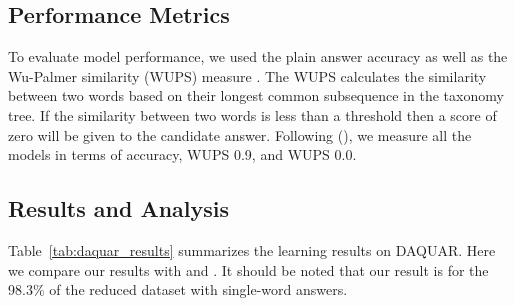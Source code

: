 \documentclass{article}
\renewcommand{\*}[1]{\textbf{#1}}
\newcommand{\shortcite}[1]{\citeauthor{#1} (\citeyear{#1})}
\begin{document}
\subsection{Performance Metrics}
To evaluate model performance, we used the plain answer accuracy as well as 
the Wu-Palmer similarity (WUPS) measure \cite{wu94, malinowski14b}. 
The WUPS calculates the similarity between two words based 
on their longest common subsequence in the taxonomy tree. If the similarity 
between two words is less than a threshold then a score of zero will be given 
to the candidate answer. Following \shortcite{malinowski14b}, 
we measure all the models in terms of accuracy, WUPS 0.9, and WUPS 0.0.

\subsection{Results and Analysis}
Table~\ref{tab:daquar_results} summarizes the learning results on DAQUAR. Here
we compare our results with \cite{malinowski14b} and \cite{malinowski15}. 
It should be noted that our result is for the 98.3\% of 
the reduced dataset with single-word answers.
\end{document}
